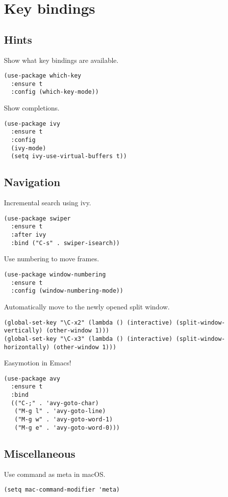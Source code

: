 \documentclass[a4paper,11pt]{article}
\begin{document}
\section{Key bindings}
\label{sec:org3306657}
\subsection{Hints}
\label{sec:org992f497}
Show what key bindings are available.
\begin{verbatim}
(use-package which-key
  :ensure t
  :config (which-key-mode))
\end{verbatim}

Show completions.
\begin{verbatim}
(use-package ivy
  :ensure t
  :config
  (ivy-mode)
  (setq ivy-use-virtual-buffers t))
\end{verbatim}

\subsection{Navigation}
\label{sec:org71730e4}
Incremental search using ivy.
\begin{verbatim}
(use-package swiper
  :ensure t
  :after ivy
  :bind ("C-s" . swiper-isearch))
\end{verbatim}

Use numbering to move frames.
\begin{verbatim}
(use-package window-numbering
  :ensure t
  :config (window-numbering-mode))
\end{verbatim}

Automatically move to the newly opened split window.
\begin{verbatim}
(global-set-key "\C-x2" (lambda () (interactive) (split-window-vertically) (other-window 1)))
(global-set-key "\C-x3" (lambda () (interactive) (split-window-horizontally) (other-window 1)))
\end{verbatim}

Easymotion in Emacs!
\begin{verbatim}
(use-package avy
  :ensure t
  :bind
  (("C-;" . 'avy-goto-char)
   ("M-g l" . 'avy-goto-line)
   ("M-g w" . 'avy-goto-word-1)
   ("M-g e" . 'avy-goto-word-0)))
\end{verbatim}

\subsection{Miscellaneous}
\label{sec:org5d8256a}
Use command as meta in macOS.
\begin{verbatim}
(setq mac-command-modifier 'meta)
\end{verbatim}
\end{document}
